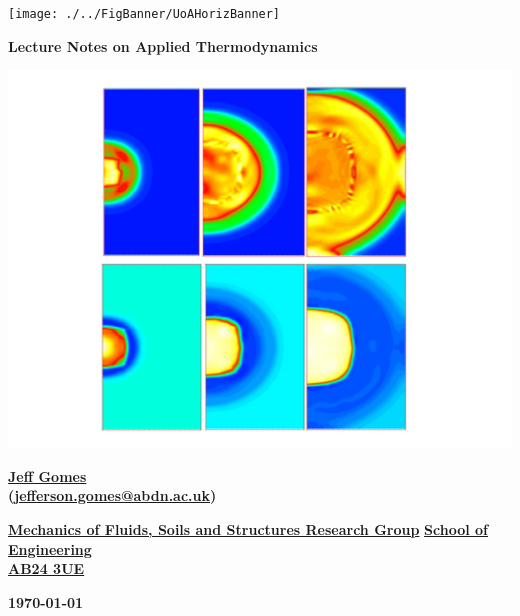 \documentclass[11pts,a4paper,amsmath,amssymb,floatfix]{book}
\theoremstyle{definition}
\begin{document}
\let\cleardoublepage\clearpage

\vspace{4cm}

\begin{titlepage}
  \vspace{3.5cm}

            \texttt{[image: ./../FigBanner/UoAHorizBanner]}

  \begin{center}

     \vspace{1.cm}

     {\bf{\Huge Lecture Notes on Applied Thermodynamics}} 
     \vspace{1.5cm}
      
      \includegraphics[width=.5\linewidth,height=.4\linewidth,clip]{./Pics/WasteRepos.png}

     \vspace{2cm}
 
     {\Large{\bf \href{tinyurl.com/nlzzbg7}{Jeff Gomes}}}\\
     {\Large{\bf (\href{mailto:jefferson.gomes@abdn.ac.uk}{jefferson.gomes@abdn.ac.uk})}}

     \vspace{1cm}
      {\Large{\bf \href{https://www.abdn.ac.uk/engineering/research/environmental-industrial-fluid-mechanics-122.php}{Mechanics of Fluids, Soils and Structures Research Group}}}
      {\Large{\bf \href{https://www.abdn.ac.uk/engineering/}{School of Engineering}}}\\
      {\Large{\bf \href{https://goo.gl/maps/q3uF9gKyLTN2}{AB24 3UE}}}



     \vspace{3cm}
     {\Large{\bf \today}}
  \end{center}

\end{titlepage}
\end{document}
